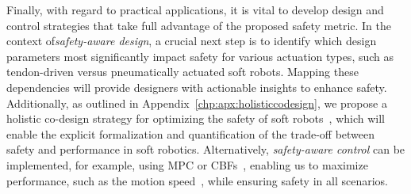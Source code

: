 Finally, with regard to practical applications, it is vital to develop design and control strategies that take full advantage of the proposed safety metric. In the context of\emph{safety-aware design}, a crucial next step is to identify which design parameters most significantly impact safety for various actuation types, such as tendon-driven versus pneumatically actuated soft robots. Mapping these dependencies will provide designers with actionable insights to enhance safety. Additionally, as outlined in Appendix~\ref{chp:apx:holisticcodesign}, we propose a holistic co-design strategy for optimizing the safety of soft robots~\citep{zardini2023co, spielberg2019learning, wang2024diffusebot, navez2024contributions}, which will enable the explicit formalization and quantification of the trade-off between safety and performance in soft robotics.
Alternatively, \emph{safety-aware control} can be implemented, for example, using \gls{MPC} or \glspl{CBF}~\citep{ames2016control}, enabling us to maximize performance, such as the motion speed~\citep{haggerty2023control}, while ensuring safety in all scenarios.